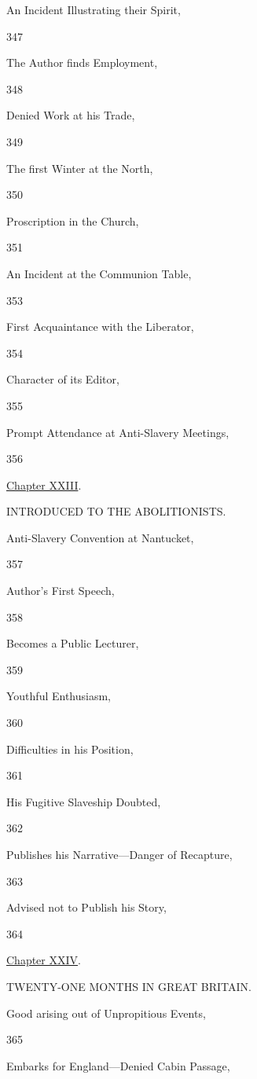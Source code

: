 An Incident Illustrating their Spirit,

347

The Author finds Employment,

348

Denied Work at his Trade,

349

The first Winter at the North,

350

Proscription in the Church,

351

An Incident at the Communion Table,

353

First Acquaintance with the Liberator,

354

Character of its Editor,

355

Prompt Attendance at Anti-Slavery Meetings,

356

\href{/wiki/My_Bondage_and_My_Freedom_(1855)/Chapter_XXIII}{Chapter
XXIII}.

INTRODUCED TO THE ABOLITIONISTS.

Anti-Slavery Convention at Nantucket,

357

Author's First Speech,

358

Becomes a Public Lecturer,

359

Youthful Enthusiasm,

360

Difficulties in his Position,

361

His Fugitive Slaveship Doubted,

362

Publishes his Narrative---Danger of Recapture,

363

Advised not to Publish his Story,

364

\href{/wiki/My_Bondage_and_My_Freedom_(1855)/Chapter_XXIV}{Chapter
XXIV}.

TWENTY-ONE MONTHS IN GREAT BRITAIN.

Good arising out of Unpropitious Events,

365

Embarks for England---Denied Cabin Passage,

